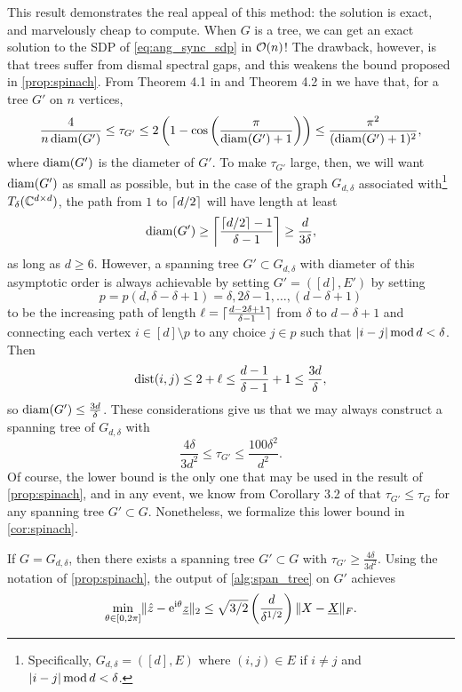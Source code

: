 This result demonstrates the real appeal of this method: the solution is exact, and marvelously cheap to compute.  When $G$ is a tree, we can get an exact solution to the SDP of \eqref{eq:ang_sync_sdp} in $\bigO(n)$!  The drawback, however, is that trees suffer from dismal spectral gaps, and this weakens the bound proposed in \cref{prop:spinach}.  From Theorem 4.1 in \cite{deabreu2006algebraicconnectivity} and Theorem 4.2 in \cite{mohar1991diameter} we have that, for a tree $G'$ on $n$ vertices, \begin{equation}\dfrac{4}{n \diam(G')} \le \tau_{G'} \le 2 \left(1 - \cos\left(\dfrac{\pi}{\diam(G') + 1}\right)\right) \le \dfrac{\pi^2}{(\diam(G') + 1)^2},\label{eq:diam_tree}\end{equation} where $\diam(G')$ is the diameter of $G'$.  To make $\tau_{G'}$ large, then, we will want $\diam(G')$ as small as possible, but in the case of the graph $G_{d, \delta}$ associated with\footnote{Specifically, $G_{d, \delta} = ([d], E)$ where $(i, j) \in E$ if $i \neq j$ and $\abs{i - j} \mod d < \delta$.} $T_\delta(\Cdxd)$, the path from $1$ to $\ceil{d/2}$ will have length at least \[\diam(G') \ge \ceil*{\frac{\ceil{d/2} - 1}{\delta - 1}} \ge \dfrac{d}{3 \delta},\] as long as $d \ge 6$.  However, a spanning tree $G' \subset G_{d, \delta}$ with diameter of this asymptotic order is always achievable by setting $G' = ([d], E')$ by setting \[p = p(d, \delta - \delta + 1) = \delta, 2 \delta - 1, \ldots, (d - \delta + 1)\] to be the increasing path of length $\ell = \ceil{\frac{d - 2 \delta + 1}{\delta- 1}}$ from $\delta$ to $d - \delta + 1$ and connecting each vertex $i \in [d] \setminus p$ to any choice $j \in p$ such that $\abs{i - j} \mod d < \delta$.  Then \[\dist(i, j) \le 2 + \ell \le \dfrac{d - 1}{\delta - 1} + 1 \le \frac{3d}{\delta},\] so $\diam(G') \le \frac{3d}{\delta}$.  These considerations give us that we may always construct a spanning tree of $G_{d, \delta}$ with \[\dfrac{4 \delta}{3 d^2} \le \tau_{G'} \le \dfrac{100 \delta^2}{d^2}.\]  Of course, the lower bound is the only one that may be used in the result of \cref{prop:spinach}, and in any event, we know from Corollary 3.2 of \cite{fiedler1973algebraic_connectivity} that $\tau_{G'} \le \tau_G$ for any spanning tree $G' \subset G$.  Nonetheless, we formalize this lower bound in \cref{cor:spinach}.

\begin{corollary}\label{cor:spinach}
  If $G = G_{d, \delta}$, then there exists a spanning tree $G' \subset G$ with $\tau_{G'} \ge \frac{4 \delta}{3 d^2}$.  Using the notation of \cref{prop:spinach}, the output of \cref{alg:span_tree} on $G'$ achieves \begin{equation*} \mintheta \norm{\hz - \eit \uz}_2 \le \sqrt{3/2} \left(\frac{d}{\delta^{1/2}}\right) \norm{X - \uX}_F. \end{equation*}
\end{corollary}

